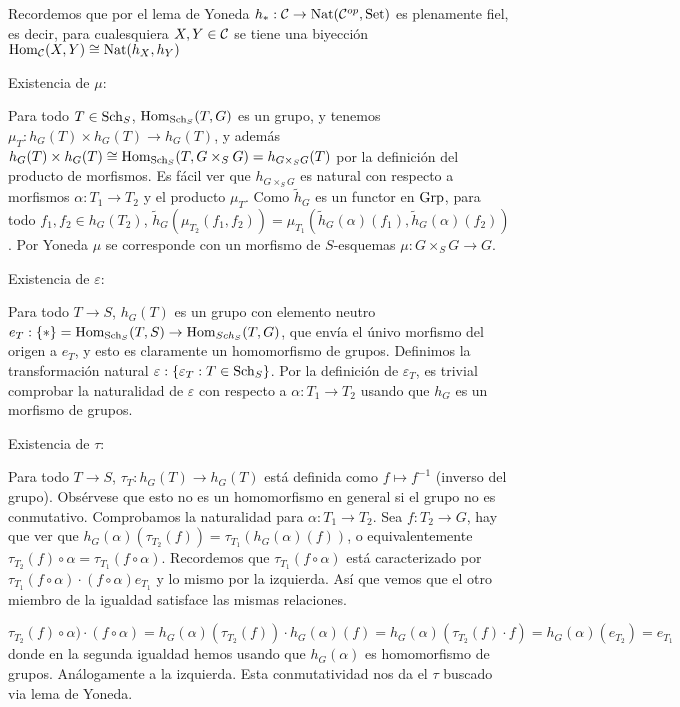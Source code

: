 \documentclass[GA.tex]{subfiles}
\begin{document}
Recordemos que por el lema de Yoneda $h_*:\mathcal{C}\to\operatorname{Nat}(\mathcal{C}^{op}, \operatorname{Set})$ es plenamente fiel, es decir, para cualesquiera $X,Y\in\mathcal{C}$ se tiene una biyección $\operatorname{Hom}_{\mathcal{C}}(X,Y)\cong \operatorname{Nat}(h_X,h_Y)$

\begin{dem}
Existencia de $\mu$:

Para todo $T\in\operatorname{Sch}_S$, $\operatorname{Hom}_{\operatorname{Sch}_S}(T,G)$ es un grupo, y tenemos $\mu_T:h_G(T)\times h_G(T)\to h_G(T)$, y además $h_G(T)\times h_G(T)\cong\operatorname{Hom}_{\operatorname{Sch}_S}(T,G\times_SG)=h_{G\times_S G}(T)$ por la definición del producto de morfismos. Es fácil ver que $h_{G\times_S G}$ es natural con respecto a morfismos $\alpha:T_1\to T_2$ y el producto $\mu_T$. Como $\tilde{h}_G$ es un functor en $\operatorname{Grp}$, para todo $f_1,f_2\in h_G(T_2)$, $\tilde{h}_G(\mu_{T_2}(f_1,f_2))=\mu_{T_1}(\tilde{h}_G(\alpha)(f_1),\tilde{h}_G(\alpha)(f_2))$. Por Yoneda $\mu$ se corresponde con un morfismo de $S$-esquemas $\mu:G\times_SG\to G$. 

Existencia de $\varepsilon$:


Para todo $T\to S$, $h_G(T)$ es un grupo con elemento neutro $e_T:\{*\}=\operatorname{Hom}_{\operatorname{Sch}_S}(T,S)\to\operatorname{Hom}_{Sch_S}(T,G)$, que envía el únivo morfismo del origen a $e_T$, y esto es claramente un homomorfismo de grupos. Definimos la transformación natural $\varepsilon:\{\varepsilon_T: T\in\operatorname{Sch}_S\}$. Por la definición de $\varepsilon_T$, es trivial comprobar la naturalidad de $\varepsilon$ con respecto a $\alpha:T_1\to T_2$ usando que $h_G$ es un morfismo de grupos. 

Existencia de $\tau$:

Para todo $T\to S$, $\tau_T:h_G(T)\to h_G(T)$ está definida como $f\mapsto f^{-1}$ (inverso del grupo). Obsérvese que esto no es un homomorfismo en general si el grupo no es conmutativo. Comprobamos la naturalidad para $\alpha:T_1\to T_2$. Sea $f:T_2\to G$, hay que ver que $h_G(\alpha)(\tau_{T_2}(f))=\tau_{T_1}(h_G(\alpha)(f))$, o equivalentemente $\tau_{T_2}(f)\circ\alpha=\tau_{T_1}(f\circ\alpha)$. Recordemos que $\tau_{T_1}(f\circ\alpha)$ está caracterizado por $\tau_{T_1}(f\circ\alpha)\cdot (f\circ\alpha)e_{T_1}$ y lo mismo por la izquierda. Así que vemos que el otro miembro de la igualdad satisface las mismas relaciones. 

\[
\tau_{T_2}(f)\circ\alpha)\cdot (f\circ\alpha)=h_G(\alpha)(\tau_{T_2}(f))\cdot h_G(\alpha)(f)=h_G(\alpha)(\tau_{T_2}(f)\cdot f)=h_G(\alpha)(e_{T_2})=e_{T_1}
\]
donde en la segunda igualdad hemos usando que $h_G(\alpha)$ es homomorfismo de grupos. Análogamente a la izquierda. Esta conmutatividad nos da el $\tau$ buscado via lema de Yoneda.


\end{dem}
\end{document}
